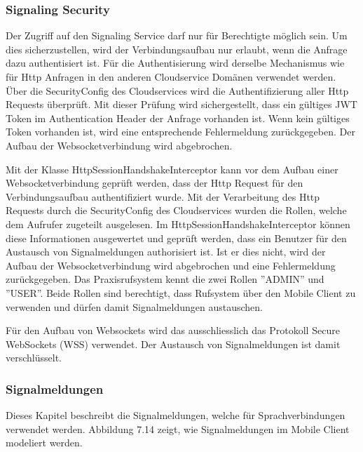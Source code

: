 \subsubsection{Signaling Security}

Der Zugriff auf den Signaling Service darf nur für Berechtigte möglich sein.
Um dies sicherzustellen, wird der Verbindungsaufbau nur erlaubt, wenn die Anfrage dazu authentisiert ist.
Für die Authentisierung wird derselbe Mechanismus wie für Http Anfragen in den anderen Cloudservice Domänen verwendet werden.
Über die SecurityConfig des Cloudservices wird die Authentifizierung aller Http Requests überprüft.
Mit dieser Prüfung wird sichergestellt, dass ein gültiges JWT Token im Authentication Header der Anfrage vorhanden ist.
Wenn kein gültiges Token vorhanden ist, wird eine entsprechende Fehlermeldung zurückgegeben.
Der Aufbau der Websocketverbindung wird abgebrochen.

Mit der Klasse HttpSessionHandshakeInterceptor kann vor dem Aufbau einer Websocketverbindung geprüft werden, dass der Http Request für den Verbindungsaufbau authentifiziert wurde.
Mit der Verarbeitung des Http Requests durch die SecurityConfig des Cloudservices wurden die Rollen, welche dem Aufrufer zugeteilt ausgelesen.
Im HttpSessionHandshakeInterceptor können diese Informationen ausgewertet und geprüft werden, dass ein Benutzer für den Austausch von Signalmeldungen authorisiert ist.
Ist er dies nicht, wird der Aufbau der Websocketverbindung wird abgebrochen und eine Fehlermeldung zurückgegeben.
Das Praxisrufsystem kennt die zwei Rollen ''ADMIN'' und ''USER''.
Beide Rollen sind berechtigt, dass Rufsystem über den Mobile Client zu verwenden und dürfen damit Signalmeldungen austauschen.

Für den Aufbau von Websockets wird das ausschliesslich das Protokoll Secure WebSockets (WSS) verwendet.
Der Austausch von Signalmeldungen ist damit verschlüsselt.

\clearpage

\subsubsection{Signalmeldungen}

Dieses Kapitel beschreibt die Signalmeldungen, welche für Sprachverbindungen verwendet werden.
Abbildung 7.14 zeigt, wie Signalmeldungen im Mobile Client modeliert werden.

